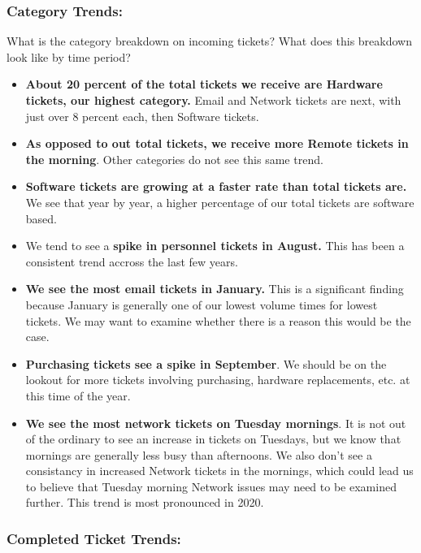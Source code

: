 \documentclass[11pt]{article}
\begin{document}
\hypertarget{category-trends}{%
\subsubsection{Category Trends:}\label{category-trends}}

What is the category breakdown on incoming tickets? What does this
breakdown look like by time period?

\begin{itemize}
\item
  \textbf{About 20 percent of the total tickets we receive are Hardware
  tickets, our highest category.} Email and Network tickets are next,
  with just over 8 percent each, then Software tickets. 
\item
  \textbf{As opposed to out total tickets, we receive more Remote
  tickets in the morning}. Other categories do not see this same trend. 
\item
  \textbf{Software tickets are growing at a faster rate than total
  tickets are.} We see that year by year, a higher percentage of our
  total tickets are software based. 
\item
  We tend to see a \textbf{spike in personnel tickets in August.} This
  has been a consistent trend accross the last few years. 
\item
  \textbf{We see the most email tickets in January.} This is a
  significant finding because January is generally one of our lowest
  volume times for lowest tickets. We may want to examine whether there
  is a reason this would be the case. 
\item
  \textbf{Purchasing tickets see a spike in September}. We should be on
  the lookout for more tickets involving purchasing, hardware
  replacements, etc. at this time of the year. 
\item
  \textbf{We see the most network tickets on Tuesday mornings}. It is
  not out of the ordinary to see an increase in tickets on Tuesdays, but
  we know that mornings are generally less busy than afternoons. We also
  don't see a consistancy in increased Network tickets in the mornings,
  which could lead us to believe that Tuesday morning Network issues may
  need to be examined further. This trend is most pronounced in 2020.
\end{itemize}

\hypertarget{completed-ticket-trends}{%
\subsubsection{Completed Ticket Trends:}\label{completed-ticket-trends}}
\end{document}
